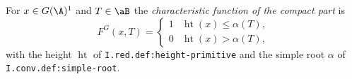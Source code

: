 For $x\in G(\A)^1$ and $T\in\aB$ the \emph{characteristic function of the compact part} is
\[
  F^G(x,T)=\begin{cases}1&\operatorname{ht}(x)\le\alpha(T),\\0&\operatorname{ht}(x)>\alpha(T),\end{cases}
\]
with the height $\operatorname{ht}$ of \texttt{I.red.def:height-primitive} and the simple root $\alpha$ of \texttt{I.conv.def:simple-root}.
